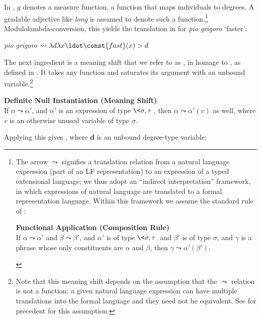 \documentclass[output=paper
,modfonts
,nonflat]{langsci/langscibook}
\begin{document}
In , $g$ denotes a measure function, a function that maps individuals to degrees. A gradable adjective like \textit{long} is assumed to denote such a function.\footnote{The arrow $\leadsto$ signifies a translation relation from a natural language expression (part of an LF representation) to an expression of a typed extensional language; we thus adopt an ``indirect interpretation'' framework, in which expressions of natural language are translated to a formal representation language. Within this framework we assume the standard rule of :

\begin{exe}
	\ex \textbf{Functional Application (Composition Rule)}\\
	If $\alpha \leadsto \alpha'$  and $\beta \leadsto \beta'$, and $\alpha'$ is of type $\<\sigma,\tau\>$ and $\beta'$ is of type $\sigma$, and $\gamma$ is a phrase whose only constituents are $\alpha$ and $\beta$, then $\gamma \leadsto \alpha'(\beta')$.
\end{exe}\vspace*{-\baselineskip}
}
Modulo\largerpage lambda-conversion, this yields the translation in  for \textit{pio grigoro} `faster':

\ea \label{ex:coppockstrand:79} \textit{pio grigoro}  $\leadsto \lambda d \lambda x \ldot \const{fast}(x) > d$\label{longer}
\z 

The next ingredient is a meaning shift that we refer to as , in homage to \citet{Fillmore1986}, as defined in . It takes any function and saturates its argument with an unbound variable.\footnote{Note that this meaning shift depends on the assumption that the $\leadsto$ relation is not a function; a given natural language expression can have multiple translations into the formal language and they need not be equivalent. See \citet{ParteeRooth1983} for precedent for this assumption.}

\ea \label{ex:coppockstrand:80}
\textbf{Definite Null Instantiation (Meaning Shift)}\\
If $\alpha \leadsto \alpha'$, and $\alpha'$ is an expression of type $\<\sigma,\tau\>$, then $\alpha \leadsto \alpha'(v)$ as well, where $v$ is an otherwise unused variable of type $\sigma$.
\z 

Applying this gives , where $\textbf{d}$ is an unbound degree-type variable:
\end{document}
